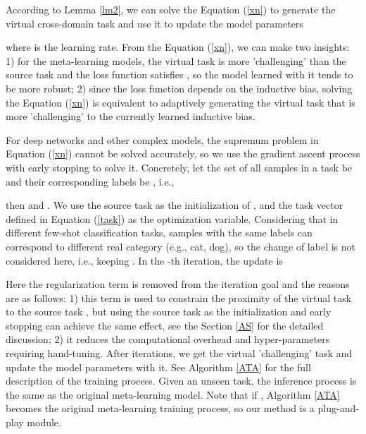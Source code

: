 \documentclass{article}
\begin{document}
According to Lemma \ref{lm2}, we can solve the Equation (\ref{xn}) to generate the virtual cross-domain task  and use it to update the model parameters 

where  is the learning rate. From the Equation (\ref{xn}), we can make two insights: 1) for the meta-learning models, the virtual task  is more 'challenging' than the source task  and the loss function satisfies , so the model learned with it tends to be more robust; 2) since the loss function  depends on the inductive bias, solving the Equation (\ref{xn}) is equivalent to adaptively generating the virtual task that is more 'challenging' to the currently learned inductive bias.

For deep networks and other complex models, the supremum problem in Equation (\ref{xn}) cannot be solved accurately, so we use the gradient ascent process with early stopping to solve it. Concretely, let the set of all samples in a task be  and their corresponding labels be , i.e.,

then  and . We use the source task  as the initialization of , and the task vector defined in Equation (\ref{task}) as the optimization variable. Considering that in different few-shot classification tasks, samples with the same labels can correspond to different real category (e.g., cat, dog), so the change of label  is not considered here, i.e., keeping . In the -th iteration, the update is

Here the regularization term  is removed from the iteration goal and the reasons are as follows: 1) this term is used to constrain the proximity of the virtual task to the source task , but using the source task as the initialization and early stopping can achieve the same effect, see the Section \ref{AS} for the detailed discussion; 2) it reduces the computational overhead and hyper-parameters requiring hand-tuning. After  iterations, we get the virtual 'challenging' task  and update the model parameters  with it. See Algorithm \ref{ATA} for the full description of the training process. Given an unseen task, the inference process is the same as the original meta-learning model. Note that if , Algorithm \ref{ATA} becomes the original meta-learning training process, so our method is a plug-and-play module.
\end{document}
